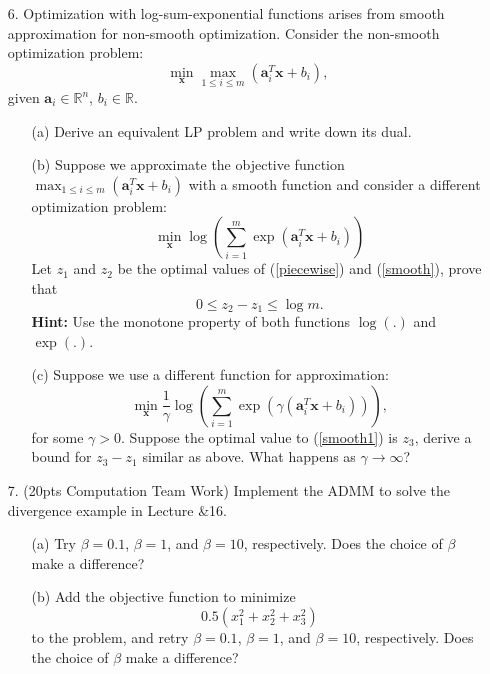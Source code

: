 \documentclass[12pt,letterpaper]{article}
\begin{document}
\begin{enumerate}
\item[6.] Optimization with log-sum-exponential functions arises from smooth approximation for non-smooth optimization. Consider the  non-smooth optimization problem:
\begin{equation}
\label{piecewise}
\min_\mathbf x \max_{1\leq i \leq m} ({\mathbf a}_i^T \mathbf x  + b_i),
\end{equation}
given $\mathbf a_i \in \mathbb R^n$, $b_i \in \mathbb R$.
\begin{itemize}
\item[(a)] Derive an equivalent LP problem and write down its dual.
\item[(b)] Suppose we approximate the objective function $\max_{1\leq i \leq m} ({\mathbf a}_i^T \mathbf x  + b_i)$ with a smooth function and consider a different  optimization problem:
\begin{equation}
\label{smooth}
\min_\mathbf x \log \left( \sum_{i=1}^m \exp({\mathbf a}_i^T \mathbf x  + b_i) \right)
\end{equation}
Let $z_1$ and $z_2$ be the optimal values of (\ref{piecewise}) and (\ref{smooth}), prove that
\begin{equation*}
0 \leq z_2 - z_1 \leq \log m.
\end{equation*}
{\bf Hint:} Use the monotone property of both functions $\log(.)$ and $\exp(.)$.
\item[(c)] Suppose we use a different function for approximation:
\begin{equation}
\label{smooth1}
\min_\mathbf x \frac{1}{\gamma} \log \left( \sum_{i=1}^m \exp(\gamma({\mathbf a}_i^T \mathbf x  + b_i)) \right),
\end{equation}
for some $\gamma > 0$.  Suppose the optimal value to (\ref{smooth1}) is $z_3$, derive a bound for $z_3 - z_1$ similar as above.  What happens as $\gamma \rightarrow \infty$?
\end{itemize}


\item[7.] (20pts Computation Team Work) Implement the ADMM to solve the divergence example in Lecture \&16.
\begin{itemize}
\item[(a)] Try $\beta=0.1$, $\beta=1$, and $\beta=10$, respectively. Does the choice of $\beta$ make a difference?

\item[(b)] Add the objective function to minimize
\[0.5(x^2_1+x^2_2+x^2_3)\]
to the problem, and retry $\beta=0.1$, $\beta=1$, and $\beta=10$, respectively. Does the choice of $\beta$ make a difference?


\end{itemize}
\end{enumerate}
\end{document}
